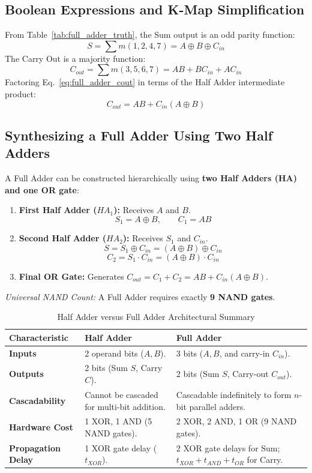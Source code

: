 \subsection{Boolean Expressions and K-Map Simplification}
From Table~\ref{tab:full_adder_truth}, the Sum output is an odd parity function:
\begin{equation}
\label{eq:full_adder_sum}
S = \sum m(1, 2, 4, 7) = A \oplus B \oplus C_{in}
\end{equation}
The Carry Out is a majority function:
\begin{equation}
\label{eq:full_adder_cout}
C_{out} = \sum m(3, 5, 6, 7) = AB + BC_{in} + AC_{in}
\end{equation}
Factoring Eq.~\ref{eq:full_adder_cout} in terms of the Half Adder intermediate product:
\begin{equation}
\label{eq:full_adder_cout_factored}
C_{out} = AB + C_{in}(A \oplus B)
\end{equation}

\subsection{Synthesizing a Full Adder Using Two Half Adders}
A Full Adder can be constructed hierarchically using \textbf{two Half Adders (HA) and one OR gate}:
\begin{enumerate}[label=\bfseries\arabic*.]
    \item \textbf{First Half Adder ($HA_1$):} Receives $A$ and $B$.
    \[ S_1 = A \oplus B, \qquad C_1 = AB \]
    \item \textbf{Second Half Adder ($HA_2$):} Receives $S_1$ and $C_{in}$.
    \[ S = S_1 \oplus C_{in} = (A \oplus B) \oplus C_{in} \]
    \[ C_2 = S_1 \cdot C_{in} = (A \oplus B) \cdot C_{in} \]
    \item \textbf{Final OR Gate:} Generates $C_{out} = C_1 + C_2 = AB + C_{in}(A \oplus B)$.
\end{enumerate}
\textit{Universal NAND Count:} A Full Adder requires exactly \textbf{9 NAND gates}.

\begin{table}[htbp]
\centering
\small
\caption{Half Adder versus Full Adder Architectural Summary}
\label{tab:ha_vs_fa}
\begin{tabularx}{\textwidth}{l X X}
\toprule
\textbf{Characteristic} & \textbf{Half Adder} & \textbf{Full Adder} \\
\midrule
\textbf{Inputs} & 2 operand bits ($A, B$). & 3 bits ($A, B$, and carry-in $C_{in}$). \\
\textbf{Outputs} & 2 bits (Sum $S$, Carry $C$). & 2 bits (Sum $S$, Carry-out $C_{out}$). \\
\textbf{Cascadability} & Cannot be cascaded for multi-bit addition. & Cascadable indefinitely to form $n$-bit parallel adders. \\
\textbf{Hardware Cost} & 1 XOR, 1 AND (5 NAND gates). & 2 XOR, 2 AND, 1 OR (9 NAND gates). \\
\textbf{Propagation Delay} & 1 XOR gate delay ($t_{XOR}$). & 2 XOR gate delays for Sum; $t_{XOR} + t_{AND} + t_{OR}$ for Carry. \\
\bottomrule
\end{tabularx}
\end{table}



